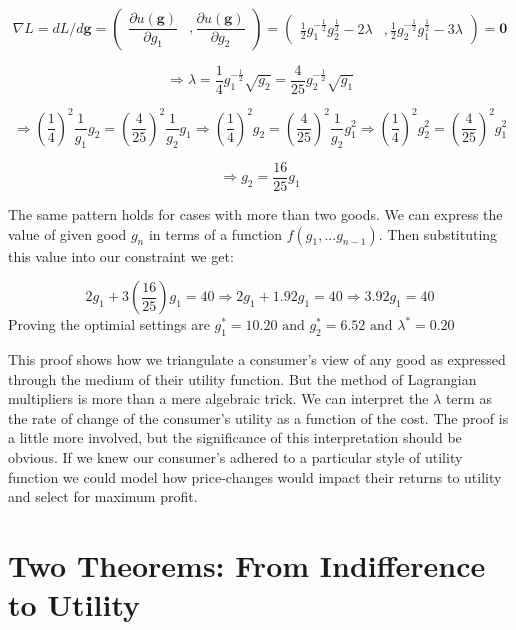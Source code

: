 \documentclass{tufte-handout}
\begin{document}
\begin{fullwidth}
\begin{example}

\[
\nabla L = dL /  d\mathbf{g} =
    \begin{pmatrix}
       \dfrac{\partial u(\mathbf{g})}{\partial g_1}   & , \dfrac{\partial u(\mathbf{g})}{\partial g_2}
    \end{pmatrix} = \begin{pmatrix}
    \frac{1}{2}g_{1}^{-\frac{1}{2}}g_{2}^{\frac{1}{2} } - 2\lambda & ,
    \frac{1}{2}g_{2}^{-\frac{1}{2}}g_{1}^{\frac{1}{2} } - 3\lambda
    \end{pmatrix} = \mathbf{0}
  \]


$$ \Rightarrow \lambda = \frac{1}{4}g_{1}^{-\frac{1}{2}}\sqrt{g_{2}} = \frac{4}{25}g_{2}^{-\frac{1}{2}}\sqrt{g_{1}}$$

$$ \Rightarrow  (\frac{1}{4})^2\frac{1}{g_{1}}g_{2} = (\frac{4}{25})^2\frac{1}{g_{2}}g_{1} \Rightarrow (\frac{1}{4})^2 g_{2} = (\frac{4}{25})^2\frac{1}{g_{2}}g_{1}^2  \Rightarrow (\frac{1}{4})^2g_{2}^{2} = (\frac{4}{25})^2g_{1}^2 $$ 

$$ \Rightarrow g_{2} = \frac{16}{25}g_{1}$$

\noindent The same pattern holds for cases with more than two goods. We can express the value of given good $g_n$ in terms of a function $f(g_{1}, ... g_{n-1}) $. Then substituting this value into our constraint we get: 

$$ 2g_{1} + 3(\frac{16}{25})g_{1} = 40 \Rightarrow 2g_{1} + 1.92g_{1} = 40 \Rightarrow 3.92g_{1} = 40$$
Proving the optimial settings are  $g_{1}^{*} = 10.20 \text{ and } g_{2}^{*} = 6.52 \text{ and } \lambda^{*} = 0.20 $

\end{example}
\end{fullwidth}

This proof shows how we triangulate a consumer's view of any good as expressed through the medium of their utility function. But the method of Lagrangian multipliers is more than a mere algebraic trick. We can interpret the $\lambda$ term as the rate of change of the consumer's utility as a function of the cost. The proof is a little more involved, but the significance of this interpretation should be obvious. If we knew our consumer's adhered to a particular style of utility function we could model how price-changes would impact their returns to utility and select for maximum profit.

\section{\textbf{Two Theorems: From Indifference to Utility}}
\label{sec:Representation}
\end{document}
